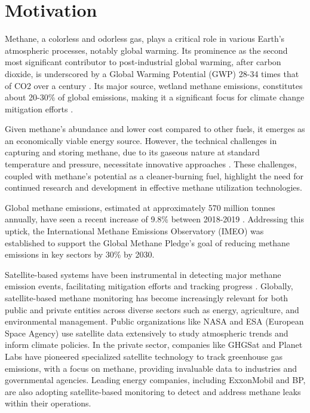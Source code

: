 \cleardoublepage
\label{chap:intro}


\section{Motivation}

Methane, a colorless and odorless gas, plays a critical role in various Earth's atmospheric processes, notably global warming. Its prominence as the second most significant contributor to post-industrial global warming, after carbon dioxide, is underscored by a Global Warming Potential (GWP) 28-34 times that of CO2 over a century \cite{tian_catalytic_2021, IPCC2013}. Its major source, wetland methane emissions, constitutes about 20-30\% of global emissions, making it a significant focus for climate change mitigation efforts \cite{bousquet_contribution_2006, chen_estimation_2006}.

Given methane's abundance and lower cost compared to other fuels, it emerges as an economically viable energy source. However, the technical challenges in capturing and storing methane, due to its gaseous nature at standard temperature and pressure, necessitate innovative approaches \cite{cardenas_is_1996, rajnauth_monetizing_2008}. These challenges, coupled with methane's potential as a cleaner-burning fuel, highlight the need for continued research and development in effective methane utilization technologies.

Global methane emissions, estimated at approximately 570 million tonnes annually, have seen a recent increase of 9.8\% between 2018-2019 \cite{stocker2014climate, friedlingstein2020global}. Addressing this uptick, the International Methane Emissions Observatory (IMEO) was established to support the Global Methane Pledge's goal of reducing methane emissions in key sectors by 30\% by 2030.

Satellite-based systems have been instrumental in detecting major methane emission events, facilitating mitigation efforts and tracking progress \cite{eo_portal_iss_2023, eo_portal_copernicus_2012, eo_portal_gosat_gw_2023, ghgsat_ghgsat_2023, writer_methane_tracking_2023}. Globally, satellite-based methane monitoring has become increasingly relevant for both public and private entities across diverse sectors such as energy, agriculture, and environmental management. Public organizations like NASA and ESA (European Space Agency) use satellite data extensively to study atmospheric trends and inform climate policies. In the private sector, companies like GHGSat and Planet Labs have pioneered specialized satellite technology to track greenhouse gas emissions, with a focus on methane, providing invaluable data to industries and governmental agencies. Leading energy companies, including ExxonMobil and BP, are also adopting satellite-based monitoring to detect and address methane leaks within their operations.

